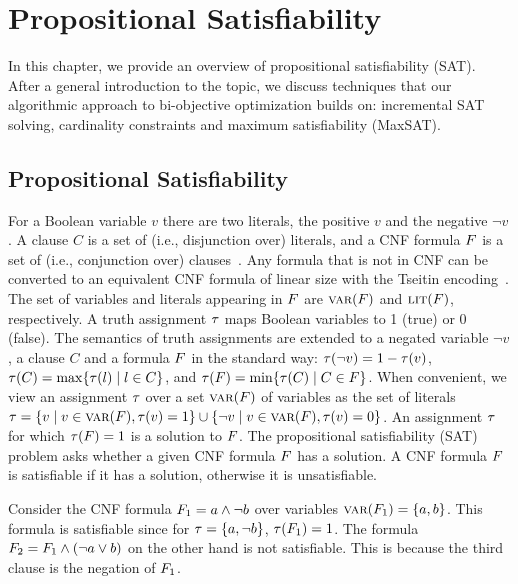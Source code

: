 \chapter{Propositional Satisfiability\label{chap:satisfiability}}

In this chapter, we provide an overview of propositional satisfiability (SAT).
After a general introduction to the topic, we discuss techniques that our algorithmic approach to bi-objective optimization builds on: incremental SAT solving, cardinality constraints and maximum satisfiability (MaxSAT).

\section{Propositional Satisfiability\label{sec:sat}}

For a Boolean variable $v$ there are two literals, the positive $v$ and the negative $\lnot v$. 
A clause $C$ is a set of (i.e., disjunction over) literals, and a CNF formula $F$ is a set of (i.e., conjunction over) clauses~\autocite{handbook2-cnf}.
Any formula that is not in CNF can be converted to an equivalent CNF formula of linear size with the Tseitin encoding~\autocites{handbook2-cnf,Tseitin1983ComplexityDerivationPropositional}.
The set of variables and literals appearing in $F$ are $\textsc{var}(F)$ and $\textsc{lit}(F)$, respectively.  
A truth assignment $\tau$ maps Boolean variables to 1 (true) or 0 (false).
The semantics of truth assignments are extended to a negated variable $\lnot v$, a clause $C$ and a formula $F$ in the standard way:
$\tau(\lnot v) = 1 - \tau(v)$, $\tau(C) = \max\{ \tau(l) \mid l \in C\}$, and $\tau(F) = \min\{\tau(C) \mid C \in F\}$.
When convenient, we view an assignment $\tau$ over a set $\textsc{var}(F)$ of variables as the set of literals $\tau = \{ v \mid v \in \textsc{var}(F),  \tau(v) = 1\} \cup \{ \lnot v \mid v \in \textsc{var}(F), \tau(v) = 0\}$.
An assignment $\tau$ for which $\tau(F) = 1$ is a solution to $F$.
The propositional satisfiability (SAT) problem asks whether a given CNF formula $F$ has a solution.
A CNF formula $F$ is satisfiable if it has a solution, otherwise it is unsatisfiable.

\begin{example}
  Consider the CNF formula $F_1 = a \land \lnot b$ over variables $\textsc{var}(F_1) = \{a,b\}$.
  This formula is satisfiable since for $\tau=\{a,\lnot b\}$, $\tau(F_1)=1$.
  The formula $F_2 = F_1 \land (\lnot a \lor b)$ on the other hand is not satisfiable.
  This is because the third clause is the negation of $F_1$.
\end{example}

